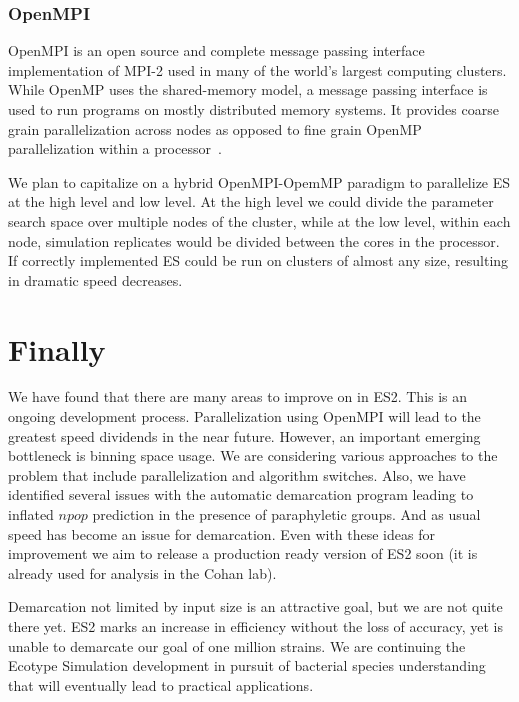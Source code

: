 \subsubsection*{OpenMPI}
OpenMPI is an open source and complete message passing interface implementation of MPI-2 used in many of the world's largest computing clusters.
While OpenMP uses the shared-memory model, a message passing interface is used to run programs on mostly distributed memory systems.
It provides coarse grain parallelization across nodes as opposed to fine grain OpenMP parallelization within a processor~\cite{gabriel04:_open_mpi}.

We plan to capitalize on a hybrid OpenMPI-OpemMP paradigm to parallelize ES at the high level and low level.
At the high level we could divide the parameter search space over multiple nodes of the cluster, while at the low level, within each node, simulation replicates would be divided between the cores in the processor.
If correctly implemented ES could be run on clusters of almost any size, resulting in dramatic speed decreases.



\section{Finally}
We have found that there are many areas to improve on in ES2.
This is an ongoing development process.
Parallelization using OpenMPI will lead to the greatest speed dividends in the near future.
However, an important emerging bottleneck is binning space usage.
We are considering various approaches to the problem that include parallelization and algorithm switches.
Also, we have identified several issues with the automatic demarcation program leading to inflated $npop$ prediction in the presence of paraphyletic groups.
And as usual speed has become an issue for demarcation.
Even with these ideas for improvement we aim to release a production ready version of ES2 soon (it is already used for analysis in the Cohan lab).

Demarcation not limited by input size is an attractive goal, but we are not quite there yet.
ES2 marks an increase in efficiency without the loss of accuracy, yet is unable to demarcate our goal of one million strains.
We are continuing the Ecotype Simulation development in pursuit of bacterial species understanding that will eventually lead to practical applications.